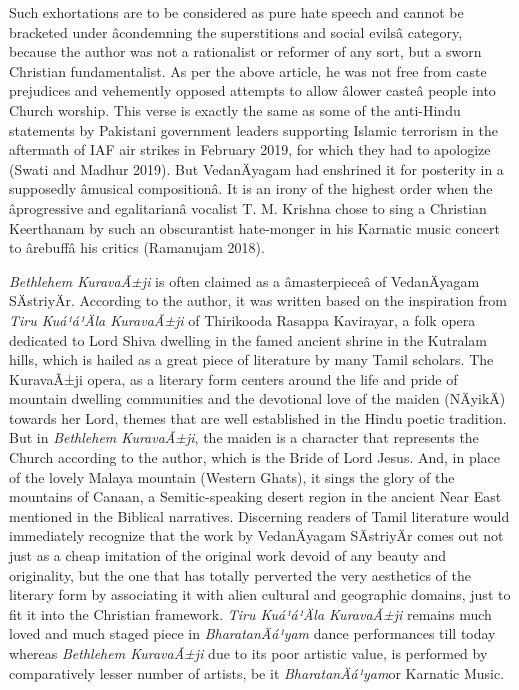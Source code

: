 Such exhortations are to be considered as pure hate speech and cannot be bracketed under âcondemning the superstitions and social evilsâ category, because the author was not a rationalist or reformer of any sort, but a sworn Christian fundamentalist. As per the above article, he was not free from caste prejudices and vehemently opposed attempts to allow âlower casteâ people into Church worship. This verse is exactly the same as some of the anti-Hindu statements by Pakistani government leaders supporting Islamic terrorism in the aftermath of IAF air strikes in February 2019, for which they had to apologize (Swati and Madhur 2019). But VedanÄyagam had enshrined it for posterity in a supposedly âmusical compositionâ. It is an irony of the highest order when the âprogressive and egalitarianâ vocalist T. M. Krishna chose to sing a Christian Keerthanam by such an obscurantist hate-monger in his Karnatic music concert to ârebuffâ his critics (Ramanujam 2018).

\textit{Bethlehem KuravaÃ±ji} is often claimed as a âmasterpieceâ of VedanÄya\-gam SÄstriyÄr. According to the author, it was written based on the inspiration from \textit{Tiru Kuá¹á¹Äla KuravaÃ±ji} of Thirikooda Rasappa Kavirayar, a folk opera dedicated to Lord Shiva dwelling in the famed ancient shrine in the Kutralam hills, which is hailed as a great piece of literature by many Tamil scholars. The KuravaÃ±ji opera, as a literary form centers around the life and pride of mountain dwelling communities and the devotional love of the maiden (NÄyikÄ) towards her Lord, themes that are well established in the Hindu poetic tradition. But in \textit{Bethlehem KuravaÃ±ji}, the maiden is a character that represents the Church according to the author, which is the Bride of Lord Jesus. And, in place of the lovely Malaya mountain (Western Ghats), it sings the glory of the mountains of Canaan, a Semitic-speaking desert region in the ancient Near East mentioned in the Biblical narratives. Discerning readers of Tamil literature would immediately recognize that the work by VedanÄyagam SÄstriyÄr comes out not just as a cheap imitation of the original work devoid of any beauty and originality, but the one that has totally perverted the very aesthetics of the literary form by associating it with alien cultural and geographic domains, just to fit it into the Christian framework. \textit{Tiru Kuá¹á¹Äla KuravaÃ±ji }remains much loved and much staged piece in \textit{BharatanÄá¹­yam} dance performances till today whereas \textit{Bethlehem KuravaÃ±ji} due to its poor artistic value, is performed by comparatively lesser number of artists, be it \textit{BharatanÄá¹­yam}or Karnatic Music.

